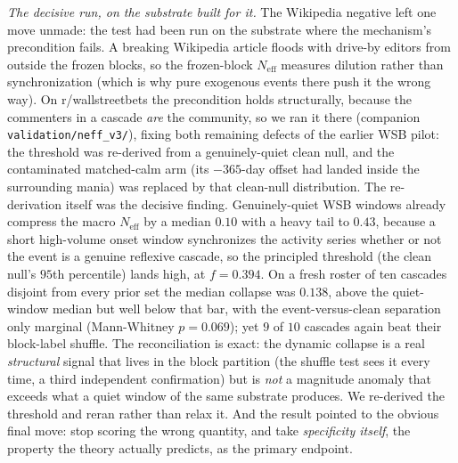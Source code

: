 \documentclass[11pt]{article}
\begin{document}
\emph{The decisive run, on the substrate built for it.} The Wikipedia negative left one move unmade: the test had been run on the substrate where the mechanism's precondition fails. A breaking Wikipedia article floods with drive-by editors from outside the frozen blocks, so the frozen-block $N_{\mathrm{eff}}$ measures dilution rather than synchronization (which is why pure exogenous events there push it the wrong way). On r/wallstreetbets the precondition holds structurally, because the commenters in a cascade \emph{are} the community, so we ran it there (companion \texttt{validation/neff\_v3/}), fixing both remaining defects of the earlier WSB pilot: the threshold was re-derived from a genuinely-quiet clean null, and the contaminated matched-calm arm (its $-365$-day offset had landed inside the surrounding mania) was replaced by that clean-null distribution. The re-derivation itself was the decisive finding. Genuinely-quiet WSB windows already compress the macro $N_{\mathrm{eff}}$ by a median $0.10$ with a heavy tail to $0.43$, because a short high-volume onset window synchronizes the activity series whether or not the event is a genuine reflexive cascade, so the principled threshold (the clean null's $95$th percentile) lands high, at $f=0.394$. On a fresh roster of ten cascades disjoint from every prior set the median collapse was $0.138$, above the quiet-window median but well below that bar, with the event-versus-clean separation only marginal (Mann-Whitney $p=0.069$); yet $9$ of $10$ cascades again beat their block-label shuffle. The reconciliation is exact: the dynamic collapse is a real \emph{structural} signal that lives in the block partition (the shuffle test sees it every time, a third independent confirmation) but is \emph{not} a magnitude anomaly that exceeds what a quiet window of the same substrate produces. We re-derived the threshold and reran rather than relax it. And the result pointed to the obvious final move: stop scoring the wrong quantity, and take \emph{specificity itself}, the property the theory actually predicts, as the primary endpoint.
\end{document}
